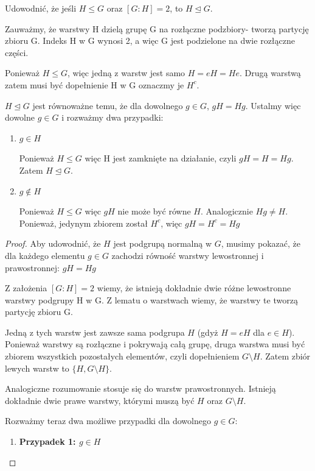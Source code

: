 \begin{problem}[4]

	Udowodnić, że jeśli $H\le G$ oraz $[G:H] = 2$, to $H\unlhd G$. 
\end{problem}
\begin{solution}

	Zauważmy, że warstwy H dzielą grupę G na rozłączne podzbiory- tworzą partycję zbioru G. Indeks H w G wynosi 2, a więc G jest podzielone na dwie rozłączne części. 

	Ponieważ $H\le G$, więc jedną z warstw jest samo $H = eH = He$.
        Drugą warstwą zatem musi być dopełnienie H w G oznaczmy je $H^{c}$. 

	$H\unlhd G$ jest równoważne temu, że dla dowolnego $g \in G$, $gH = Hg$. Ustalmy więc dowolne  $g\in G$ i rozważmy dwa przypadki:
	\begin{enumerate}
		\item $g\in H$

			Ponieważ $H\le G$ więc H jest zamknięte na działanie, czyli $gH = H = Hg$. Zatem  $H\unlhd G$.
		\item $g \not\in H$ 

			Ponieważ $H\le G$ więc $gH$ nie może być równe  $H$. Analogicznie $Hg \neq H$. Ponieważ, jedynym zbiorem został $H^{c}$, więc $gH = H^{c} = Hg$
	\end{enumerate}


\begin{proof}

	Aby udowodnić, że $H$ jest podgrupą normalną w $G$, musimy pokazać, że dla każdego elementu $g\in G$ zachodzi równość warstwy lewostronnej i prawostronnej: $gH = Hg$

Z założenia $[G:H] = 2$ wiemy, że istnieją dokładnie dwie różne lewostronne warstwy podgrupy H w G. Z lematu o warstwach wiemy, że warstwy te tworzą partycję zbioru G.

Jedną z tych warstw jest zawsze sama podgrupa $H$ (gdyż $H = eH$ dla $e \in H$). Ponieważ warstwy są rozłączne i pokrywają całą grupę, druga warstwa musi być zbiorem wszystkich pozostałych elementów, czyli dopełnieniem $G \setminus H$. Zatem zbiór lewych warstw to $\{H, G \setminus H\}$.

Analogiczne rozumowanie stosuje się do warstw prawostronnych. Istnieją dokładnie dwie prawe warstwy, którymi muszą być $H$ oraz $G \setminus H$.

Rozważmy teraz dwa możliwe przypadki dla dowolnego $g \in G$:

\begin{enumerate}
    \item \textbf{Przypadek 1: $g \in H$}
    

\end{enumerate}
\end{proof}
\end{solution}

